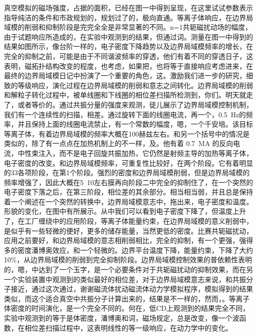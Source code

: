 真空模拟的磁场强度，占据的面积，已经在图一中得到呈现，在这里试试参数表示指导纯洁的条件和市政规划的，规划过了的，极向直通。等离子体响应，在边界局域模的削弱和抑制阶段是完完全全是非常显著的不同。n=1共轭磁扰动场的幅度，由于试题响应所造成的，在实验中观测到的结果，但通过词。测量在图一中得到的结果如图所示，像台阶一样的，电子密度下降趋势以及边界局域模频率的增长，在完全的抑制之前，可能是由于不同谐波频率的穿透，他们有着不同的穿透日子，这表明，磁拓扑结构改变的程度，也考虑，如果把，也将等于直接响应考虑进来，在最终的边界局域模日记中扮演了一个重要的角色，这。激励我们进一步的研究，细致的等级响应，演化过程在边界局域模的削弱和意志之间转化。边界局域模的削弱和解粒子转化过程中，被单线圈和下线圈的相位差扫描所检测到，你们。明天就走了，或者等价的。通过共振分量的强度来观测，徒儿展示了边界局域模控制机制，我们有一个连续性的扫描，相差。通过旋转下面的线圈电流，再一个，\SI{0.5}{\hertz}的频率，并且保持上面的线圈电流禁止，有一个常数的幅度，嗯，一个千安培。该目标等离子体，有着边界局域模的频率大概在100赫兹左右。和另一个括号中的情况是类似的，除了有一点点在加热机制上的不一样，及。他有着 \SI{0.7}{\mega\ampere} 的反向电流，中性束注入，而不是电子回旋共振加热，它仍然是射频主导的加热等离子体，电子密度的改变。和边界局域模频率，可重复性比较好，在两个阶段。它有着明显的33各项阶段，在第1个阶段。强烈的密度和边界局域模削弱，但是边界局域模的频率增强了，因此大概在5~10左右膜再向阶段二中完全的抑制住了，在一个突然的电子密度下落之后，在第三阶段，相位差的其余部分。相当相当弱，并且总是保持着一个阐述在一个突然的转换中，边界局域模意志中，拖出来，电子密度和温度。形貌的变化，在图中有所展示。从中我们可以看到电子密度下降了，但温度上升了，在工厂缠绕中的应用阶段，等离子体能量约束，在边界局域模的意义削弱中，是似乎有一些轻微的便好，更多的储存能量，当然更低的密度。比赛共轭磁扰动，应用之前要好，和边界局域模的意志相削弱相比，完全的抑制，有一个更强，强得多的密度潘博奥效应，和一个轻微的。边界平台温度下降，能量约束，下降了大约10\%，从边界局域模的削弱到完全抑制阶段。边界局域模控制效果的普依赖性表明的，嗯，中达到了一个玉字，是一个必要条件对于共轭磁扰动的抑制效果，而在另一个实验装置中观测到的类似最好的相位差，对于边界局域模意志来说，和共振分子接近，通过这次通过，谢谢磁流体扰动磁流体动力学模拟程序，模拟得到的结果类似，而这个适合真空中共振分子计算出来的，结果是不一样的，然而，。等离子体密度的时间演化，是一个完全不同的。何在，低CD上观测到的结果完全不同，实验中观测到的等于是体密度，潘博奥和词，磁场规定，总是改变，像一个波函数，在相位差扫描过程中，这表明线性的等一级响应，在动力学中的变化。

